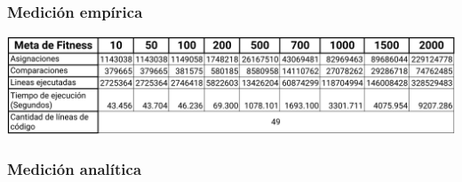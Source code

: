 \documentclass{article}
\begin{document}
\subsubsection{Medición empírica}
\begin{center}
  \includegraphics[scale=0.2]{neat/med-emp.png}
\end{center}

\subsubsection{Medición analítica}
\end{document}
